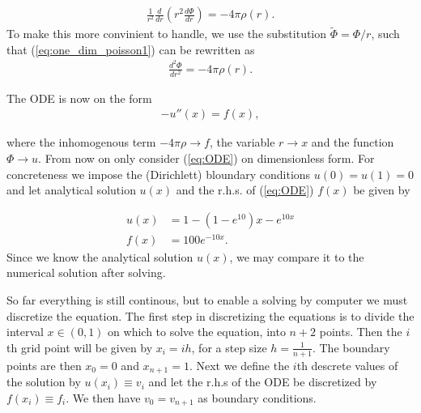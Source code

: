 \documentclass[twocolumn]{aastex62}
\begin{document}
\begin{align}
	\frac{1}{r^2}\frac{d}{dr}\left(r^2\frac{d\Phi}{dr}\right) = -4\pi\rho(r).
\label{eq:one_dim_poisson1}	
\end{align}
To make this more convinient to handle, we use the substitution $\tilde{\Phi} = \Phi/r$, such that (\ref{eq:one_dim_poisson1}) can be rewritten as 
\begin{align}
	\frac{d^2\Phi}{dr^2} = -4\pi\rho(r).
\end{align}

The ODE is now on the form 
\begin{align}
	-u''(x) = f(x),
	\label{eq:ODE}
\end{align}

where the inhomogenous term $-4\pi\rho\to f$, the variable $r\to x$ and the function $\Phi\to u$. From now on only consider (\ref{eq:ODE}) on dimensionless form. For concreteness we impose the (Dirichlett) bloundary conditions $u(0) = u(1) = 0$ and let analytical solution $u(x)$ and the r.h.s. of (\ref{eq:ODE}) $f(x)$ be given by

\begin{align}
	u(x) &= 1 - (1 - e^{10})x - e^{10x}\\
	f(x) &= 100e^{-10x}.
\end{align}
Since we know the analytical solution $u(x)$, we may compare it to the numerical solution after solving.

So far everything is still continous, but to enable a solving by computer we must discretize the equation. The first step in discretizing the equations is to divide the interval $x\in(0,1)$ on which to solve the equation, into $n+2$ points. Then the $i$th grid point will be given by $x_i = ih$, for a step size $h = \frac{1}{n + 1}$. The boundary points are then $x_0 = 0$ and $x_{n+1} = 1$. Next we define the $i$th descrete values of the solution by $u(x_i) \equiv v_i$ and let the r.h.s of the ODE be discretized by $f(x_i) \equiv f_i$. We then have $v_0 = v_{n+1}$ as boundary conditions.
\end{document}
